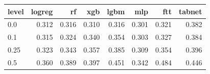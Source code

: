 \begin{tabular}{lrrrrrrr}
\toprule
level & logreg & rf & xgb & lgbm & mlp & ftt & tabnet \\
\midrule
0.0 & 0.312 & 0.316 & 0.310 & 0.316 & 0.301 & 0.321 & 0.382 \\
0.1 & 0.315 & 0.324 & 0.340 & 0.354 & 0.303 & 0.327 & 0.384 \\
0.25 & 0.323 & 0.343 & 0.357 & 0.385 & 0.309 & 0.354 & 0.396 \\
0.5 & 0.360 & 0.389 & 0.397 & 0.451 & 0.342 & 0.484 & 0.446 \\
\bottomrule
\end{tabular}

